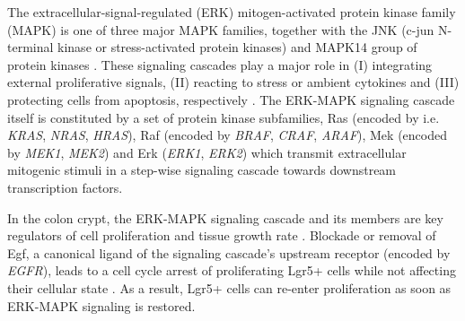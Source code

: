 \begin{flushleft}
The extracellular-signal-regulated (ERK) mitogen-activated protein kinase family (MAPK) is one of three major MAPK families, together with the JNK (c-jun N-terminal kinase or stress-activated protein kinases) and MAPK14 group of protein kinases \parencite{zhangMAPKSignalPathways2002}. These signaling cascades play a major role in (I) integrating external proliferative signals, (II) reacting to stress or ambient cytokines and (III) protecting cells from apoptosis, respectively \parencite{fangMAPKSignallingPathways2005}. The ERK-MAPK signaling cascade itself is constituted by a set of protein kinase subfamilies, Ras (encoded by i.e. \textit{KRAS}, \textit{NRAS}, \textit{HRAS}), Raf (encoded by \textit{BRAF}, \textit{CRAF}, \textit{ARAF}), Mek (encoded by \textit{MEK1}, \textit{MEK2}) and Erk (\textit{ERK1}, \textit{ERK2}) which transmit extracellular mitogenic stimuli in a step-wise signaling cascade towards downstream transcription factors. \par

In the colon crypt, the ERK-MAPK signaling cascade and its members are key regulators of cell proliferation and tissue growth rate \parencite{hTalesCryptNew2019}. Blockade or removal of Egf, a canonical ligand of the signaling cascade's upstream receptor (encoded by \textit{EGFR}), leads to a cell cycle arrest of proliferating Lgr5+ cells while not affecting their cellular state \parencite{basakInducedQuiescenceLgr52017}. As a result, Lgr5+ cells can re-enter proliferation as soon as ERK-MAPK signaling is restored.
\par


\end{flushleft}
